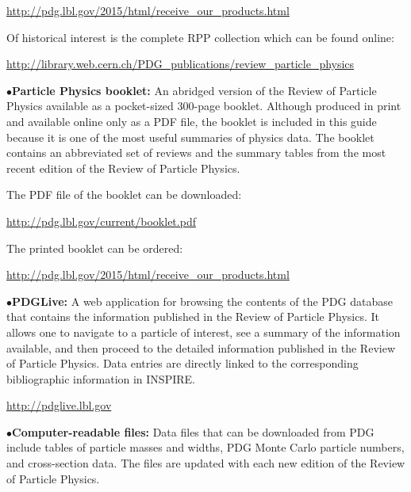          \item{}\qquad\url{http://pdg.lbl.gov/2015/html/receive\_our\_products.html}

\item{} Of historical interest is the complete RPP collection which can be found online:

         \item{}\qquad\url{http://library.web.cern.ch/PDG\_publications/review\_particle\_physics}

\medskip

\item{$\bullet$}{\bf Particle Physics booklet:}
An abridged version of the Review of Particle Physics available as a pocket-sized 300-page booklet. Although produced in print and available online only as a PDF file, the booklet is included in this guide because it is one of the most useful summaries of physics data. The booklet contains an abbreviated set of reviews and the summary tables from the most recent edition of the Review of Particle Physics.

\item{} The PDF file of the booklet can be downloaded: 

         \item{}\qquad\url{http://pdg.lbl.gov/current/booklet.pdf}

\item{} The printed booklet can be ordered: 

         \item{}\qquad\url{http://pdg.lbl.gov/2015/html/receive\_our\_products.html}


\medskip

\item{$\bullet$}{\bf PDGLive:}
A web application for browsing the contents of the PDG database that contains the information published in the Review of Particle Physics. It allows one to navigate to a particle of interest, see a summary of the information available, and then proceed to the detailed information published in the Review of Particle Physics. Data entries are directly linked to the corresponding bibliographic information in INSPIRE.

    \item{}\qquad\url{http://pdglive.lbl.gov}


\medskip



\item{$\bullet$}{\bf Computer-readable files:}
Data files that can be downloaded from PDG include tables of particle masses and widths, PDG Monte Carlo particle numbers, and cross-section data. The files are updated with each new edition of the Review of Particle Physics. 

